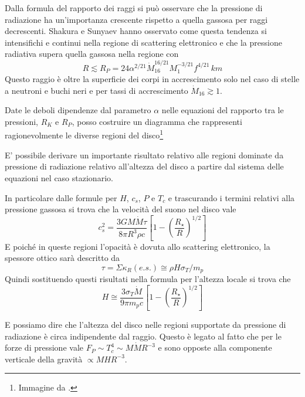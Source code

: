 \documentclass[a4paperbi]{article}
\begin{document}
	Dalla formula del rapporto dei raggi si può osservare che la pressione di radiazione ha un'importanza crescente rispetto a quella gassosa per raggi decrescenti. Shakura e Sunyaev hanno osservato come questa tendenza si intensifichi e continui nella regione di scattering elettronico e che la pressione radiativa supera quella gassosa nella regione con
	\begin{equation}
		R\lesssim R_P=24\alpha^{2/21}\dot{M}^{16/21}_{16}M^{-3/21}_1f^{4/21}\,km
	\end{equation}
	Questo raggio è oltre la superficie dei corpi in accrescimento solo nel caso di stelle a neutroni e buchi neri e per tassi di accrescimento $\dot{M}_{16}\gtrsim 1$.
	
	Date le deboli dipendenze dal parametro $\alpha$ nelle equazioni del rapporto tra le pressioni, $R_K$ e $R_P$, posso costruire un diagramma che rappresenti ragionevolmente le diverse regioni del disco\footnote{Immagine da \cite{FrankKingRaineAccretionPower}.}

	E' possibile derivare un importante risultato relativo alle regioni dominate da pressione di radiazione relativo all'altezza del disco a partire dal sistema delle equazioni nel caso stazionario.
	
	In particolare dalle formule per $H$, $c_s$, $P$ e $T_c$ e trascurando i termini relativi alla pressione gassosa si trova che la velocità del suono nel disco vale
	\begin{equation*}
		c_s^2=\frac{3GM\dot{M}\tau}{8\pi R^3\rho c}\left[1-\left(\frac{R_{\star}}{R}\right)^{1/2}\right]
	\end{equation*}
	E poiché in queste regioni l'opacità è dovuta allo scattering elettronico, la spessore ottico sarà descritto da
	\begin{equation*}
		\tau=\Sigma\kappa_R(e.s.)\cong\rho H\sigma_T/m_p
	\end{equation*}
	Quindi sostituendo questi risultati nella formula per l'altezza locale si trova che
	\begin{equation}
		H\cong\frac{3\sigma_T\dot{M}}{9\pi m_pc}\left[1-\left(\frac{R_{\star}}{R}\right)^{1/2}\right]
	\end{equation}
		 
	E possiamo dire che l'altezza del disco nelle regioni supportate da pressione di radiazione è circa indipendente dal raggio. Questo è legato al fatto che per le forze di pressione vale $F_P\sim T_c^4\sim M\dot{M}R^{-3}$ e sono opposte alla componente verticale della gravità $\propto MHR^{-3}$.
	
\end{document}
